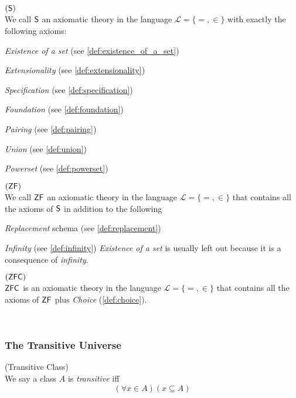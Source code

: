 \begin{definition}{$(\sf{S})$}\label{def:s}\\ %
We call $\sf{S}$ an axiomatic theory in the language $\mathscr{L} = \{=, \in\}$ with exactly the following axioms:
\bce[(i)]
\item \emph{Existence of a set} (see \ref{def:existence_of_a_set})
\item \emph{Extensionality} (see \ref{def:extensionality})
\item \emph{Specification} (see \ref{def:specification})
\item \emph{Foundation} (see \ref{def:foundation})
\item \emph{Pairing} (see \ref{def:pairing})
\item \emph{Union} (see \ref{def:union})
\item \emph{Powerset} (see \ref{def:powerset})
\ece
\end{definition}

\begin{definition}{$(\sf{ZF})$}\label{def:zf}\\ %
We call $\sf{ZF}$ an axiomatic theory in the language $\mathscr{L} = \{=, \in\}$ that contains all the axioms of $\sf{S}$ in addition to the following
\bce[(i)]
\item \emph{Replacement} schema (see \ref{def:replacement})
\item \emph{Infinity} (see \ref{def:infinity})
\ece
\emph{Existence of a set} is usually left out because it is a consequence of \emph{infinity}.
\end{definition}

\begin{definition}{$(\sf{ZFC})$}\label{def:zfc}\\ %
$\sf{ZFC}$ is an axiomatic theory in the language $\mathscr{L} = \{=, \in\}$ that contains all the axioms of $\sf{ZF}$ plus \emph{Choice} (\ref{def:choice}).
\end{definition}

\

\subsubsection{The Transitive Universe}
\begin{definition}{(Transitive Class)}\label{def:transitivity}\\ %
We say a class $A$ is \emph{transitive} iff
\begin{equation}
(\forall x \in A)(x \subseteq A)
\end{equation}
\end{definition}

